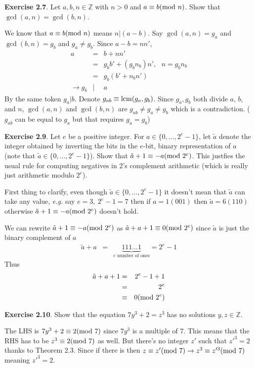 \documentclass[aps,preprint,preprintnumbers,nofootinbib,showpacs,prd]{revtex4-1}
\newcommand{\eg}{{\it e.g.} }
\newcommand{\nbea}{\begin{eqnarray*}}
\newcommand{\neea}{\end{eqnarray*}}
\begin{document}
{\bf Exercise 2.7}.  Let $a, b, n \in \mathbb{Z}$ with $n > 0$ and $a \equiv b ({\rm mod~} n)$. Show that
$\gcd(a, n) = \gcd(b, n)$.

We know that $a \equiv b ({\rm mod~} n)$ means $n|(a-b)$. Say $\gcd(a,n) = g_a$ and $\gcd(b,n) = g_b$ and $g_a \neq g_b$. Since $a-b = nn'$, 
%
\nbea
a & = & b + nn' \\
& = & g_bb' + (g_bn_b)n',~~~ n = g_b n_b \\
& = & g_b(b' + n_bn') \\
\to g_b & | & a
\neea
%
By the same token $g_a|b$. Denote $g_{ab} \equiv {\rm lcm}({g_a,g_b})$. Since $g_a,g_b$ both divide $a$, $b$, and $n$, $\gcd(a,n)$ and $\gcd(b,n)$ are $g_{ab} \neq g_a \neq g_b$ which is a contradiction. ($g_{ab}$ can be equal to $g_a$ but that requires $g_a = g_b$)

{\bf Exercise 2.9}.  Let $e$ be a positive integer. For $a \in \{0, \dots , 2^e - 1\}$, let $\tilde a$ denote the integer obtained by inverting the bits in the $e$-bit, binary representation of $a$ (note that $\tilde a \in \{0, \dots , 2^e - 1\}$). Show that $\tilde a + 1 \equiv -a ({\rm mod~} 2^e)$. This justfies the usual rule for computing negatives in 2's complement arithmetic (which is really just arithmetic modulo $2^e$).

First thing to clarify, even though $\tilde a \in \{0, \dots , 2^e - 1\}$ it doesn't mean that $\tilde a$ can take any value, \eg say $e=3,~2^e-1 = 7$ then if $a=1(001)$ then $\tilde a = 6(110)$ otherwise $\tilde a + 1 \equiv -a ({\rm mod~} 2^e)$ doesn't hold.

We can rewrite $\tilde a + 1 \equiv -a ({\rm mod~} 2^e)$ as $\tilde a + a + 1 \equiv 0 ({\rm mod~} 2^e)$ since $\tilde a$ is just the binary complement of $a$
%
\nbea
\tilde a + a & = & \underbrace{111 \dots 1}_\text{$e$ number of ones} = 2^e - 1
\neea
%
Thus
%
\nbea
\tilde a + a + 1 & = & 2^e - 1 + 1 \\
& = & 2^e \\
& \equiv & 0 ({\rm mod~} 2^e)
\neea
%

{\bf Exercise 2.10}. Show that the equation $7y^3 + 2 = z^3$ has no solutions $y, z \in \mathbb{Z}$.

The LHS is $7y^3 + 2 \equiv 2({\rm mod~}7)$ since $7y^3$ is a multiple of $7$. This means that the RHS has to be $z^3 \equiv 2({\rm mod~}7)$ as well. But there's no integer $z'$ such that $z'^3 = 2$ thanks to Theorem 2.3. Since if there is then $z \equiv z' ({\rm mod~} 7) \to z^3 \equiv z'^3({\rm mod~} 7)$ meaning $z'^3 = 2$.
\end{document}
